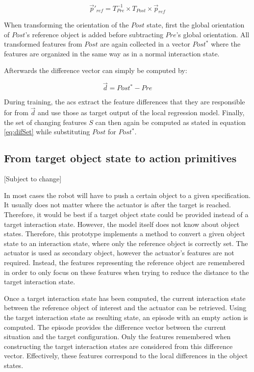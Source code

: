 \begin{equation}
\vec{p}'_{ref} = T^{-1}_{Pre} \times T_{Post} \times \vec{p}_{ref}
\end{equation}

When transforming the orientation of the $Post$ state, first the global orientation of $Post$'s reference object is added before subtracting $Pre$'s global orientation. All transformed features from $Post$ are again collected in a vector $Post^*$ where the features are organized in the same way as in a normal interaction state.

Afterwards the difference vector can simply be computed by:

\begin{equation}
\vec{d} = Post^* - Pre
\end{equation}

During training, the \glspl{ac} extract the feature differences that they are responsible for from $\vec{d}$ and use those as target output of the local regression model.
Finally, the set of changing features $S$ can then again be computed as stated in equation \ref{eq:difSet} while substituting $Post$ for $Post^*$.

\subsection{From target object state to action primitives\label{sec:pairPlanningReal}}

[Subject to change] %

In most cases the robot will have to push a certain object to a given specification. It usually does not matter where the actuator is after the target is reached. Therefore, it would be best if a target object state could be provided instead of a target interaction state. However, the model itself does not know about object states. Therefore, this prototype implements a method to convert a given object state to an interaction state, where only the reference object is correctly set. The actuator is used as secondary object, however the actuator's features are not required. Instead, the features representing the reference object are remembered in order to only focus on these features when trying to reduce the distance to the target interaction state. 

Once a target interaction state has been computed, the current interaction state between the reference object of interest and the actuator can be retrieved. Using the target interaction state as resulting state, an episode with an empty action is computed. The episode provides the difference vector between the current situation and the target configuration. Only the features remembered when constructing the target interaction states are considered from this difference vector. Effectively, these features correspond to the local differences in the object states. 


